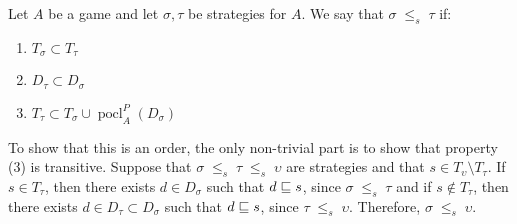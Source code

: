\documentclass{article}
\newcommand{\stle}{{\;\le_s\;}}
\DeclareMathOperator{\pocl}{pocl}
\begin{document}
\begin{definition}
  Let $A$ be a game and let $\sigma,\tau$ be strategies for $A$.  We say that $\sigma\stle\tau$ if:

  \begin{enumerate}[1)]
    \item $T_\sigma\subset T_\tau$
    \item $D_\tau\subset D_\sigma$
    \item $T_\tau\subset T_\sigma \cup \pocl_A^P(D_\sigma)$
  \end{enumerate}
\end{definition}

To show that this is an order, the only non-trivial part is to show that property (3) is transitive.  Suppose that $\sigma\stle\tau\stle\upsilon$ are strategies and that $s\in T_\upsilon\setminus T_\tau$.  If $s\in T_\tau$, then there exists $d\in D_\sigma$ such that $d\sqsubseteq s$, since $\sigma\stle\tau$ and if $s\not\in T_\tau$, then there exists $d\in D_\tau\subset D_\sigma$ such that $d\sqsubseteq s$, since $\tau\stle\upsilon$.  Therefore, $\sigma\stle\upsilon$.
\end{document}
